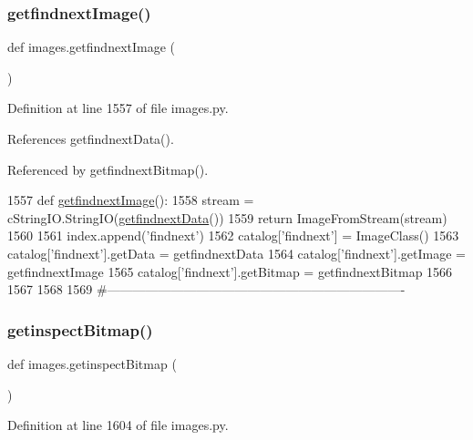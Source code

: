 \subsubsection{\texorpdfstring{getfindnext\+Image()}{getfindnextImage()}}
{\footnotesize\ttfamily def images.\+getfindnext\+Image (\begin{DoxyParamCaption}{ }\end{DoxyParamCaption})}



Definition at line 1557 of file images.\+py.



References getfindnext\+Data().



Referenced by getfindnext\+Bitmap().


\begin{DoxyCode}
1557 \textcolor{keyword}{def }\hyperlink{namespaceimages_a1999c628386d92b6a1b50f61cfe4e534}{getfindnextImage}():
1558     stream = cStringIO.StringIO(\hyperlink{namespaceimages_abb3065c822065fe636d42835fa80b3b5}{getfindnextData}())
1559     \textcolor{keywordflow}{return} ImageFromStream(stream)
1560 
1561 index.append(\textcolor{stringliteral}{'findnext'})
1562 catalog[\textcolor{stringliteral}{'findnext'}] = ImageClass()
1563 catalog[\textcolor{stringliteral}{'findnext'}].getData = getfindnextData
1564 catalog[\textcolor{stringliteral}{'findnext'}].getImage = getfindnextImage
1565 catalog[\textcolor{stringliteral}{'findnext'}].getBitmap = getfindnextBitmap
1566 
1567 
1568 
1569 \textcolor{comment}{#----------------------------------------------------------------------}
\end{DoxyCode}
\mbox{\label{namespaceimages_a3b8808244fec6d009105a9172e9dce7a}} 
\subsubsection{\texorpdfstring{getinspect\+Bitmap()}{getinspectBitmap()}}
{\footnotesize\ttfamily def images.\+getinspect\+Bitmap (\begin{DoxyParamCaption}{ }\end{DoxyParamCaption})}



Definition at line 1604 of file images.\+py.



